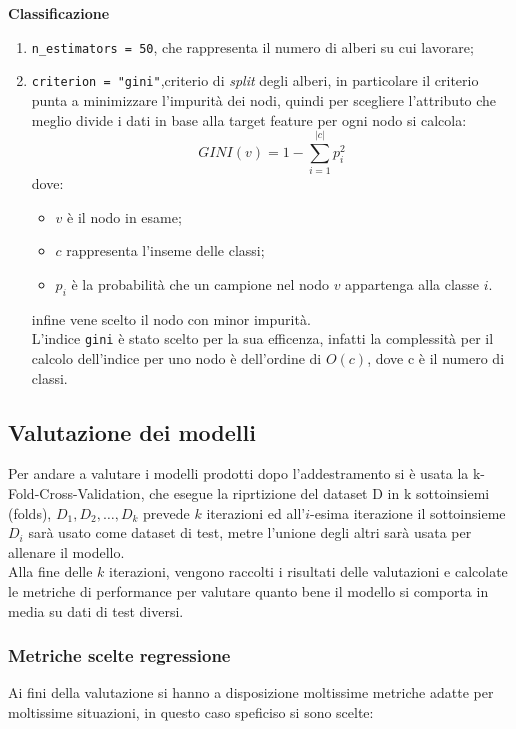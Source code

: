 \documentclass[italian,12pt,a4paper]{article}
\begin{document}
		\textbf{Classificazione}
		\begin{enumerate}
			
			\item \texttt{n\_estimators = 50}, che rappresenta il numero di alberi su cui lavorare;
			\item  \texttt{criterion = "gini"},criterio di \textit{split} degli alberi, in particolare il criterio punta a minimizzare l'impurità dei nodi, quindi per scegliere l'attributo che meglio divide i dati in base alla target feature per ogni nodo si calcola:
			$$GINI(v) = 1-\sum_{i = 1}^{|c|}p_i^2$$
			dove:
			\begin{itemize}
				\item $v$ è il nodo in esame;
				\item $c$ rappresenta l'inseme delle classi;
				\item $p_i$ è la probabilità che un campione nel nodo $v$ appartenga alla classe $i$.
			\end{itemize}
			infine vene scelto il nodo con minor impurità. \\
			\linebreak
			L'indice \texttt{gini} è stato scelto per la sua efficenza, infatti la complessità per il calcolo dell'indice per uno nodo è dell'ordine di $O(c)$, dove c è il numero di classi.
			
		\end{enumerate}
	
	\subsection{Valutazione dei modelli}
	Per andare a valutare i modelli prodotti dopo l'addestramento si è usata la k-Fold-Cross-Validation, che esegue la riprtizione del dataset D in k sottoinsiemi (folds), $D_1, D_2, \dots , D_k$ prevede $k$ iterazioni ed all'$i$-esima iterazione il sottoinsieme $D_i$ sarà usato come dataset di test, metre l'unione degli altri sarà usata per allenare il modello. \\
	\linebreak
	Alla fine delle $k$ iterazioni, vengono raccolti i risultati delle valutazioni e calcolate le metriche di performance per valutare quanto bene il modello si comporta in media su dati di test diversi.
	
	\subsubsection{Metriche scelte regressione}
	Ai fini della valutazione si hanno a disposizione moltissime metriche adatte per moltissime situazioni, in questo caso speficiso si sono scelte:
	
\end{document}
